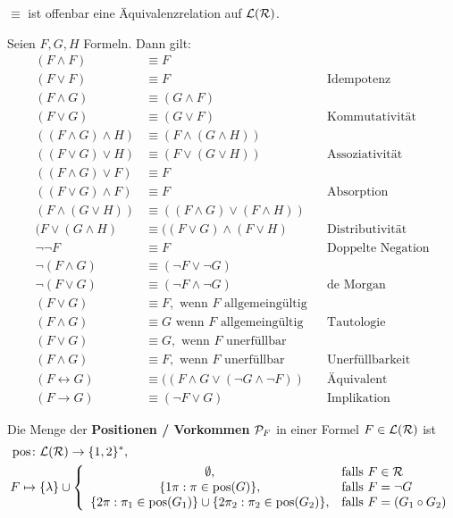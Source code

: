 \begin{bemerkung}
	$\equiv$ ist offenbar eine Äquivalenzrelation auf $\L(\RR)$.
\end{bemerkung}

\begin{satz}\label{satz3.19}
	Seien $F,G,H$ Formeln. Dann gilt:
	\begin{align*}
		(F\wedge F)&\equiv F\\
		(F\vee F)&\equiv F &&\text{Idempotenz}\\[1ex]
		(F\wedge G)&\equiv(G\wedge F)\\
		(F\vee G)&\equiv (G\vee F) &&\text{Kommutativität}\\[1ex]
		((F\wedge G)\wedge H)&\equiv(F\wedge(G\wedge H))\\
		((F\vee G)\vee H)&\equiv(F\vee(G\vee H)) &&\text{Assoziativität}\\[1ex]
		((F\wedge G)\vee F)&\equiv F\\
		((F\vee G)\wedge F)&\equiv F &&\text{Absorption}\\[1ex]
		(F\wedge(G\vee H))&\equiv((F\wedge G)\vee(F\wedge H))\\
		(F\vee(G\wedge H)&\equiv((F\vee G)\wedge(F\vee H) &&\text{Distributivität}\\[1ex]
		\neg\neg F&\equiv F &&\text{Doppelte Negation}\\[1ex]
		\neg(F\wedge G)&\equiv(\neg F\vee\neg G)\\
		\neg(F\vee G)&\equiv(\neg F\wedge\neg G)&&\text{de Morgan}\\[1ex]
		(F\vee G)&\equiv F,\text{ wenn $F$ allgemeingültig}\\
		(F\wedge G)&\equiv G\text{ wenn $F$ allgemeingültig} &&\text{Tautologie}\\[1ex]
		(F\vee G)&\equiv G,\text{ wenn $F$ unerfüllbar}\\
		(F\wedge G)&\equiv F,\text{ wenn $F$ unerfüllbar} &&\text{Unerfüllbarkeit}\\[1ex]
		(F\leftrightarrow G)&\equiv((F\wedge G\vee(\neg G\wedge\neg F)) &&\text{Äquivalent}\\[1ex]
		(F\to G)&\equiv(\neg F\vee G) &&\text{Implikation}
	\end{align*}
\end{satz}

\begin{definition}\label{def3.20}
	Die Menge der \textbf{Positionen / Vorkommen} $\P_F$ in einer Formel $F\in\L(\RR)$ ist
	\begin{align*}
		&\pos\colon\L(\RR)\to\lbrace1,2\rbrace^\ast,\\
		&F\mapsto\lbrace\lambda\rbrace\cup\left\lbrace\begin{array}{cl}
			\emptyset ,&\falls F\in\RR\\
			\lbrace 1\pi:\pi\in\pos(G)\rbrace, &\falls F=\neg G\\
			\lbrace 2\pi:\pi_1\in\pos(G_1)\rbrace\cup\lbrace2\pi_2:\pi_2\in\pos(G_2)\rbrace
			,&\falls F=(G_1\circ G_2)
		\end{array}\right.
	\end{align*}
\end{definition}

